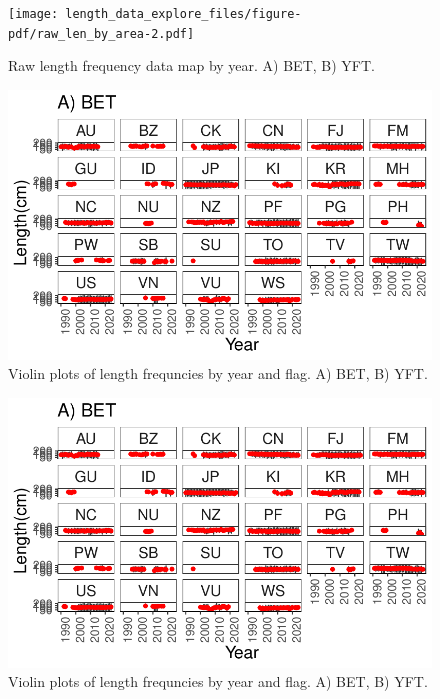 \documentclass[
  letterpaper,
  DIV=11,
  numbers=noendperiod]{scrartcl}
\begin{document}
\begin{figure}

{\centering \texttt{[image: length\_data\_explore\_files/figure-pdf/raw\_len\_by\_area-2.pdf]}

}

\caption{Raw length frequency data map by year. A) BET, B) YFT.}

\end{figure}

\begin{figure}

{\centering \includegraphics{length_data_explore_files/figure-pdf/yr_flag_violin-1.pdf}

}

\caption{Violin plots of length frequncies by year and flag. A) BET, B)
YFT.}

\end{figure}

\begin{figure}

{\centering \includegraphics{length_data_explore_files/figure-pdf/yr_flag_violin-2.pdf}

}

\caption{Violin plots of length frequncies by year and flag. A) BET, B)
YFT.}

\end{figure}
\end{document}
